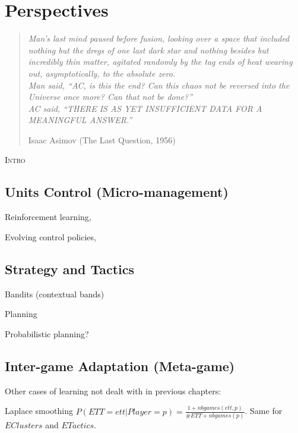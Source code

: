 \chapter{Perspectives}
\label{chapter:perspectives}

\begin{quotation}\textit{
Man's last mind paused before fusion, looking over a space that included nothing but the dregs of one last dark star and nothing besides but incredibly thin matter, agitated randomly by the tag ends of heat wearing out, asymptotically, to the absolute zero.\\
Man said, ``AC, is this the end? Can this chaos not be reversed into the Universe once more? Can that not be done?''\\
AC said, ``THERE IS AS YET INSUFFICIENT DATA FOR A MEANINGFUL ANSWER.''
}
\begin{flushright}Isaac Asimov (The Last Question, 1956)\end{flushright}\end{quotation}

\lettrine{I}{ntro}

\chaptertoc

\section{Units Control (Micro-management)}
Reinforcement learning, \citep{Marthi05concurrenthierarchical}


Evolving control policies, \citep{Miles2007}

\section{Strategy and Tactics}

Bandits (contextual bands)

Planning \citep{Wolfe11}

Probabilistic planning?

\section{Inter-game Adaptation (Meta-game)}
Other cases of learning not dealt with in previous chapters:
\citep{metalevelbehavioradaptrts}


Laplace smoothing $P(ETT=ett|Player=p)= \frac{1 + nbgames(ett,p)}{\#ETT + nbgames(p)}$. Same for $EClusters$ and $ETactics$.


